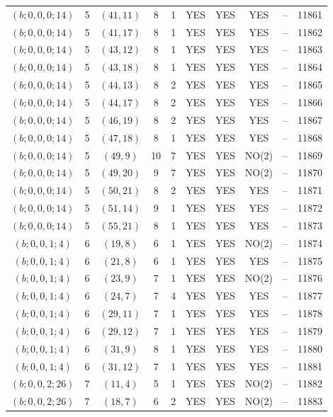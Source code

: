 \begin{longtable}{|c|c|c|c|c|c|c|c|c|c|}
$(b; 0, 0, 0; 14)$ & 5 & $(41, 11)$ & 8 & 1 & YES & YES & YES & -- & 11861\\
$(b; 0, 0, 0; 14)$ & 5 & $(41, 17)$ & 8 & 1 & YES & YES & YES & -- & 11862\\
$(b; 0, 0, 0; 14)$ & 5 & $(43, 12)$ & 8 & 1 & YES & YES & YES & -- & 11863\\
$(b; 0, 0, 0; 14)$ & 5 & $(43, 18)$ & 8 & 1 & YES & YES & YES & -- & 11864\\
$(b; 0, 0, 0; 14)$ & 5 & $(44, 13)$ & 8 & 2 & YES & YES & YES & -- & 11865\\
$(b; 0, 0, 0; 14)$ & 5 & $(44, 17)$ & 8 & 2 & YES & YES & YES & -- & 11866\\
$(b; 0, 0, 0; 14)$ & 5 & $(46, 19)$ & 8 & 2 & YES & YES & YES & -- & 11867\\
$(b; 0, 0, 0; 14)$ & 5 & $(47, 18)$ & 8 & 1 & YES & YES & YES & -- & 11868\\
$(b; 0, 0, 0; 14)$ & 5 & $(49, 9)$ & 10 & 7 & YES & YES & NO(2) & -- & 11869\\
$(b; 0, 0, 0; 14)$ & 5 & $(49, 20)$ & 9 & 7 & YES & YES & NO(2) & -- & 11870\\
$(b; 0, 0, 0; 14)$ & 5 & $(50, 21)$ & 8 & 2 & YES & YES & YES & -- & 11871\\
$(b; 0, 0, 0; 14)$ & 5 & $(51, 14)$ & 9 & 1 & YES & YES & YES & -- & 11872\\
$(b; 0, 0, 0; 14)$ & 5 & $(55, 21)$ & 8 & 1 & YES & YES & YES & -- & 11873\\
$(b; 0, 0, 1; 4)$ & 6 & $(19, 8)$ & 6 & 1 & YES & YES & NO(2) & -- & 11874\\
$(b; 0, 0, 1; 4)$ & 6 & $(21, 8)$ & 6 & 1 & YES & YES & YES & -- & 11875\\
$(b; 0, 0, 1; 4)$ & 6 & $(23, 9)$ & 7 & 1 & YES & YES & NO(2) & -- & 11876\\
$(b; 0, 0, 1; 4)$ & 6 & $(24, 7)$ & 7 & 4 & YES & YES & YES & -- & 11877\\
$(b; 0, 0, 1; 4)$ & 6 & $(29, 11)$ & 7 & 1 & YES & YES & YES & -- & 11878\\
$(b; 0, 0, 1; 4)$ & 6 & $(29, 12)$ & 7 & 1 & YES & YES & YES & -- & 11879\\
$(b; 0, 0, 1; 4)$ & 6 & $(31, 9)$ & 8 & 1 & YES & YES & YES & -- & 11880\\
$(b; 0, 0, 1; 4)$ & 6 & $(31, 12)$ & 7 & 1 & YES & YES & YES & -- & 11881\\
$(b; 0, 0, 2; 26)$ & 7 & $(11, 4)$ & 5 & 1 & YES & YES & NO(2) & -- & 11882\\
$(b; 0, 0, 2; 26)$ & 7 & $(18, 7)$ & 6 & 2 & YES & YES & NO(2) & -- & 11883\\

\end{longtable}
